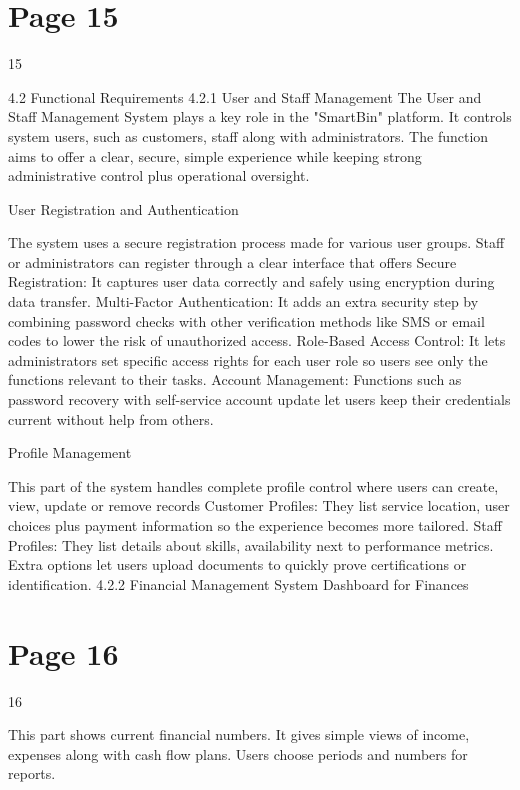 \documentclass{article}
\begin{document}
\section*{Page 15}
   
 
 15  
 
4.2 Functional Requirements 
4.2.1 User and Staff Management 
The User and Staff Management System plays a key role in the "SmartBin" platform. It controls 
system users, such as customers, staff along with administrators. The function aims to offer a 
clear, secure, simple experience while keeping strong administrative control plus operational 
oversight. 
 
User Registration and Authentication 
 
The system uses a secure registration process made for various user groups. Staff or 
administrators can register through a clear interface that offers 
Secure Registration: It captures user data correctly and safely using encryption during data 
transfer. 
Multi-Factor Authentication: It adds an extra security step by combining password checks with 
other verification methods like SMS or email codes to lower the risk of unauthorized access. 
Role-Based Access Control: It lets administrators set specific access rights for each user role so 
users see only the functions relevant to their tasks. 
Account Management: Functions such as password recovery with self-service account update 
let users keep their credentials current without help from others. 
 
Profile Management 
 
This part of the system handles complete profile control where users can create, view, update 
or remove records 
Customer Profiles: They list service location, user choices plus payment information so the 
experience becomes more tailored. 
Staff Profiles: They list details about skills, availability next to performance metrics. Extra 
options let users upload documents to quickly prove certifications or identification. 
4.2.2 Financial Management System 
Dashboard for Finances 

\section*{Page 16}
   
 
 16  
 
This part shows current financial numbers. It gives simple views of income, expenses along with 
cash flow plans. Users choose periods and numbers for reports. 
 
\end{document}
